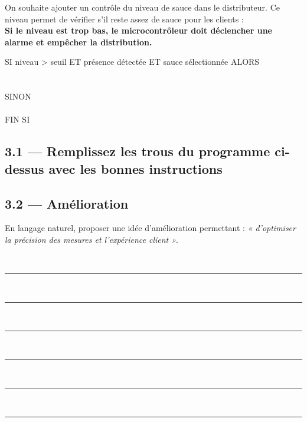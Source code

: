 \documentclass[12pt,a4paper]{article}
\begin{document}
On souhaite ajouter un contrôle du niveau de sauce dans le distributeur. Ce niveau permet de vérifier s'il reste assez de sauce pour les clients : \\
\textbf{Si le niveau est trop bas, le microcontrôleur doit déclencher une alarme et empêcher la distribution.}

\begin{tcolorbox}
SI niveau > seuil ET présence détectée ET sauce sélectionnée ALORS\\
\hspace*{0.5cm}\underline{\hspace{10cm}} \\ %
\hspace*{0.5cm}\underline{\hspace{10cm}} \\ %
SINON\\
\hspace*{0.5cm}\underline{\hspace{10cm}} \\ %
FIN SI
\end{tcolorbox}

\vspace{1cm}

\subsection*{3.1 — Remplissez les trous du programme ci-dessus avec les bonnes instructions}

\vspace{2cm}

\subsection*{3.2 — Amélioration}
En langage naturel, proposer une idée d’amélioration permettant :
\textit{« d’optimiser la précision des mesures et l’expérience client »}.

\vspace{1cm}

\noindent\textbf{ }\\[0.01cm]
\rule{\linewidth}{0.5pt}\\[1cm]
\rule{\linewidth}{0.5pt}\\[1cm]
\rule{\linewidth}{0.5pt}\\[1cm]
\rule{\linewidth}{0.5pt}\\[1cm]
\rule{\linewidth}{0.5pt}\\[1cm]
\rule{\linewidth}{0.5pt}\\[1cm]
\end{document}
